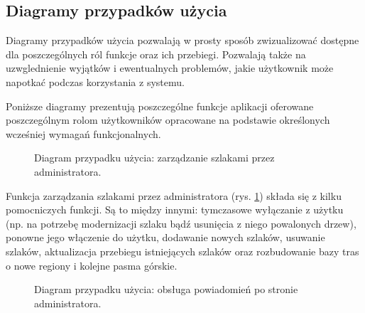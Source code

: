     \subsection{Diagramy przypadków użycia}
    Diagramy przypadków użycia pozwalają w prosty sposób zwizualizować dostępne dla poszczególnych ról funkcje oraz ich przebiegi. Pozwalają także na uzwglednienie wyjątków i ewentualnych problemów, jakie użytkownik może napotkać podczas korzystania z systemu.

    Poniższe diagramy prezentują poszczególne funkcje aplikacji oferowane poszczególnym rolom użytkowników opracowane na podstawie określonych wcześniej wymagań funkcjonalnych.

    \setlength{\fboxrule}{0.5pt}
    \begin{figure}[H]
        \centering
        \caption{Diagram przypadku użycia: zarządzanie szlakami przez administratora.}
        \label{ucd:szlaki}
    \end{figure}
    Funkcja zarządzania szlakami przez administratora (rys. \ref{ucd:szlaki}) składa się z kilku pomocniczych funkcji. Są to między innymi: tymczasowe wyłączanie z użytku (np. na potrzebę modernizacji szlaku bądź usunięcia z niego powalonych drzew), ponowne jego włączenie do użytku, dodawanie nowych szlaków, usuwanie szlaków, aktualizacja przebiegu istniejących szlaków oraz rozbudowanie bazy tras o nowe regiony i kolejne pasma górskie.

    \setlength{\fboxrule}{0.5pt}
    \begin{figure}[H]
        \centering
        \caption{Diagram przypadku użycia: obsługa powiadomień po stronie administratora.}
        \label{ucd:powiadomienia}
    \end{figure}
    
